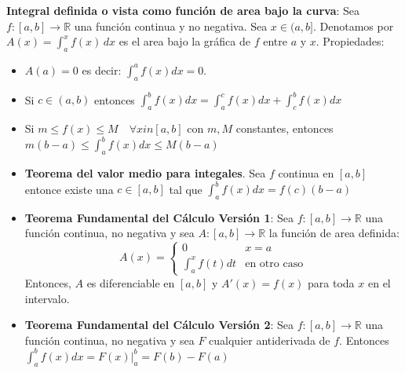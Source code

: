 \documentclass[pdftex,11pt,a4paper]{article}
\begin{document}
\textbf{Integral definida o vista como función de area bajo la curva}: Sea $f:[a,b]\rightarrow \mathbb{R}$ una función continua y no negativa. Sea $x\in (a,b]$. Denotamos por $A(x) = \int_a^xf(x)\, dx$ es el area bajo la gráfica de $f$ entre $a$ y $x$. Propiedades:

\begin{itemize}
    \item $A(a) = 0$ es decir: $\int_a^af(x) dx = 0$. 
    \item Si $c \in (a,b)$ entonces $\int_a^bf(x) dx = \int_a^cf(x) dx + \int_c^bf(x) dx$
    \item Si $m \leq f(x) \leq M \quad \forall x in [a,b]$ con $m, M$ constantes, entonces $m(b-a) \leq \int_a^bf(x)dx\leq M(b-a)$
    \item \textbf{Teorema del valor medio para integales}. Sea $f$ continua en $[a,b]$ entonce existe una $c\in [a,b]$ tal que $\int_a^bf(x)dx = f(c)(b-a)$
    \item \textbf{Teorema Fundamental del Cálculo Versión 1}: Sea $f:[a,b]\rightarrow\mathbb{R}$ una función continua, no negativa y sea $A:[a,b]\rightarrow\mathbb{R}$ la función de area definida: 
    $$A(x) = \begin{cases}0 & x= a\\ \int_a^x f(t)dt & \text{en otro caso} \end{cases}$$
    Entonces, $A$ es diferenciable en $[a,b]$ y $A'(x) = f(x)$ para toda $x$ en el intervalo.
    \item \textbf{Teorema Fundamental del Cálculo Versión 2}: Sea $f:[a,b]\rightarrow\mathbb{R}$ una función continua, no negativa y sea $F$ cualquier antiderivada de $f$. Entonces $\int_a^bf(x)dx = F(x)|_a^b = F(b) - F(a)$
\end{itemize}
\end{document}

